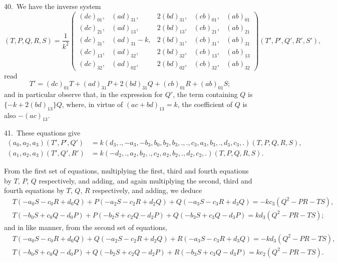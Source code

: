 \documentclass[11pt,a4paper]{article}
\theoremstyle{definition}
\begin{document}
\medskip

40.\ We have the inverse system
\[
(T, P, Q, R, S) = \frac{1}{k^2}
\begin{pmatrix}
(dc)_{01}, & (ad)_{31}, & 2(bd)_{31}, & (cb)_{01}, & (ab)_{01}\\
(dc)_{21}, & (ad)_{13}, & 2(bd)_{13}, & (cb)_{21}, & (ab)_{21}\\
(dc)_{31}, & (ad)_{31} - k, & 2(bd)_{31}, & (cb)_{31}, & (ab)_{31}\\
(dc)_{13}, & (ad)_{32}, & 2(bd)_{32}, & (cb)_{13}, & (ab)_{13}\\
(dc)_{32}, & (ad)_{02}, & 2(bd)_{02}, & (cb)_{32}, & (ab)_{32}
\end{pmatrix}
(T', P', Q', R', S'),
\]
read
\[
T' = (dc)_{01}T + (ad)_{31}P + 2(bd)_{31}Q + (cb)_{01}R + (ab)_{01}S;
\]
and in particular observe that, in the expression for $Q'$, the term containing $Q$ is $\{-k + 2(bd)_{13}\}Q$, where, in virtue of $(ac + bd)_{13} = k$, the coefficient of $Q$ is also $-(ac)_{13}$.

\medskip

41.\ These equations give
\begin{align*}
(a_0, a_2, a_3)(T', P', Q') &= k(d_3, ., -a_3, -b_3, b_0, b_2, b_3, ., ., c_3, a_3, b_3, ., d_3, c_3, .)(T, P, Q, R, S),\\
(a_1, a_2, a_3)(T', Q', R') &= k(-d_2, ., a_2, b_2, ., c_2, a_2, b_2, ., d_2, c_2, .)(T, P, Q, R, S).
\end{align*}

From the first set of equations, multiplying the first, third and fourth equations by $T$, $P$, $Q$ respectively, and adding, and again multiplying the second, third and fourth equations by $T$, $Q$, $R$ respectively, and adding, we deduce
\begin{align*}
&T(-a_0S - c_0R + d_0Q) + P(-a_2S - c_2R + d_2Q) + Q(-a_3S - c_3R + d_3Q) = -kc_3(Q^2 - PR - TS),\\
&T(-b_0S + c_0Q - d_0P) + P(-b_2S + c_2Q - d_2P) + Q(-b_3S + c_3Q - d_3P) = kd_3(Q^2 - PR - TS);
\end{align*}
and in like manner, from the second set of equations,
\begin{align*}
&T(-a_0S - c_0R + d_0Q) + Q(-a_2S - c_2R + d_2Q) + R(-a_3S - c_3R + d_3Q) = -kd_3(Q^2 - PR - TS),\\
&T(-b_0S + c_0Q - d_0P) + Q(-b_2S + c_2Q - d_2P) + R(-b_3S + c_3Q - d_3P) = kc_2(Q^2 - PR - TS).
\end{align*}

\medskip
\end{document}
